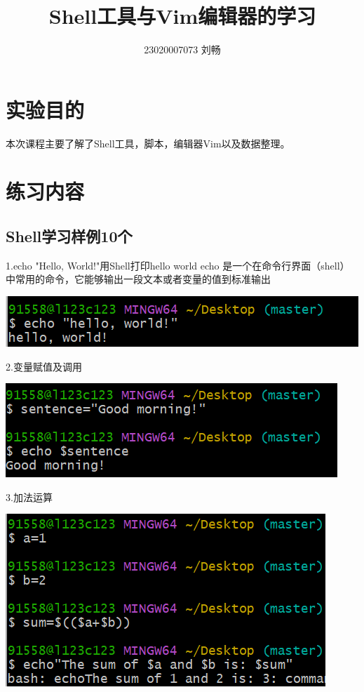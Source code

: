 \documentclass{article}
\title{Shell工具与Vim编辑器的学习}
\author{23020007073  刘畅}
\begin{document}
\maketitle

\section{实验目的}
本次课程主要了解了Shell工具，脚本，编辑器Vim以及数据整理。

\section{练习内容}
\subsection{Shell学习样例10个}

1.echo "Hello, World!"用Shell打印hello world
echo 是一个在命令行界面（shell）中常用的命令，它能够输出一段文本或者变量的值到标准输出

\noindent
\begin{minipage}{\linewidth}
  \centering
  \includegraphics[width=0.5\linewidth]{echo.png}
  \label{fig:example}
\end{minipage}


2.变量赋值及调用

\noindent
\begin{minipage}{\linewidth}
  \centering
  \includegraphics[width=0.5\linewidth]{fuzhi.png}
  \label{fig:example}
\end{minipage}

3.加法运算

\noindent
\begin{minipage}{\linewidth}
	\centering
	\includegraphics[width=0.5\linewidth]{sum.png}
	\label{fig:example}
\end{minipage}
\end{document}
